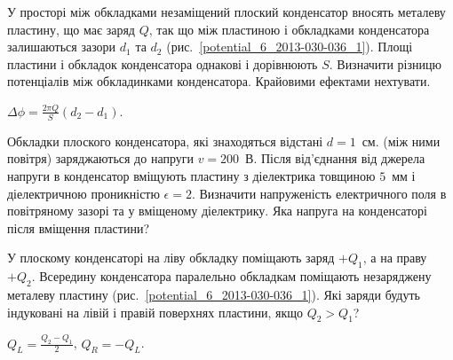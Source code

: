 \begin{problem}\label{prb:potential_6_2013-030-036_1}
    У просторі між обкладками незаміщений плоский конденсатор вносять металеву пластину, що має заряд $Q$, так що між пластиною і обкладками конденсатора залишаються зазори $d_1$ та $d_2$ (рис.~\ref{potential_6_2013-030-036_1}). Площі пластини і обкладок конденсатора однакові і дорівнюють $S$. Визначити різницю потенціалів між обкладинками конденсатора. Крайовими ефектами нехтувати.
\begin{solution}
	$\Delta\phi = \frac{2\pi Q}{S} (d_2 - d_1)$.
\end{solution}
\end{problem}

\begin{problem}
	Обкладки плоского конденсатора, які знаходяться відстані $d = 1$~см. (між ними повітря) заряджаються до напруги $v = 200$~В. Після від'єднання від джерела напруги в конденсатор вміщують пластину з діелектрика товщиною $5$~мм і
	діелектричною проникністю $\epsilon = 2$. Визначити напруженість електричного поля в повітряному зазорі та у вміщеному діелектрику. Яка напруга на конденсаторі після вміщення пластини?
\end{problem}

\begin{problem}\label{prb:potential_6_2013-030-036_4}
    У плоскому конденсаторі на ліву обкладку поміщають заряд $+Q_1$, а на праву $+Q_2$. Всередину конденсатора паралельно обкладкам поміщають незаряджену металеву пластину (рис.~\ref{potential_6_2013-030-036_1}). Які заряди будуть індуковані на лівій і правій поверхнях пластини, якщо $Q_2>Q_1$?
\begin{solution}
	$Q_{L} = \frac{Q_2 - Q_1}{2}$, $Q_{R} = -Q_{L}$.
\end{solution}
\end{problem}

